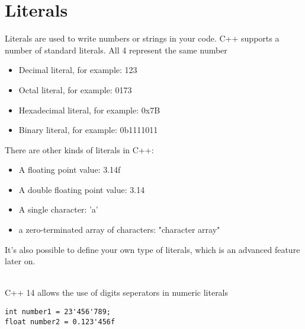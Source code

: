 \documentclass{article}
\begin{document}
\section{Literals}
Literals are used to write numbers or strings in your code. C++ supports a number of standard literals.
All 4 represent the same number
\begin{itemize}
	\item Decimal literal, for example: 123
	\item Octal literal, for example: 0173
	\item Hexadecimal literal, for example: 0x7B
	\item Binary literal, for example: 0b1111011
\end{itemize}
There are other kinds of literals in C++:
\begin{itemize}
	\item A floating point value: 3.14f
	\item A double floating point value: 3.14
	\item A single character: 'a'
	\item a zero-terminated array of characters: "character array"
\end{itemize}
It's also possible to define your own type of literals, which is an advanced feature later on.

\noindent \\ C++ 14 allows the use of digits seperators in numeric literals
\begin{verbatim}
int number1 = 23'456'789;
float number2 = 0.123'456f
\end{verbatim}
\end{document}
